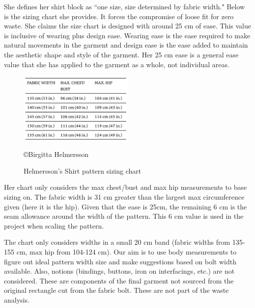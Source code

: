 She defines her shirt block as ``one size, size determined by fabric width." Below is the sizing chart she provides. It forces the compromise of loose fit for zero waste. 
She claims the size chart is designed with around 25 cm of ease. This value is inclusive of wearing plus design ease. Wearing ease is the ease required to make natural movements in the garment and design ease is the ease added to maintain the aesthetic shape and style of the garment. Her 25 cm ease is a general ease value that she has applied to the garment as a whole, not individual areas. 
\begin{figure} [H] %
    \centering %
    \includegraphics[width = 0.5\textwidth]{Images/BH size chart.png} %
    \caption{Helmersson's Shirt pattern sizing chart}
    \copyright {Birgitta Helmersson} %
\end{figure}
Her chart only considers the max chest/bust and max hip measurements to base sizing on. The fabric width is 31 cm greater than the largest max circumference given (here it is the hip). Given that the ease is 25cm, the remaining 6 cm is the seam allowance around the width of the pattern. This 6 cm value is used in the project when scaling the pattern.

The chart only considers widths in a small 20 cm band (fabric widths from 135-155 cm, max hip from 104-124 cm). Our aim is to use body measurements to figure out ideal pattern width size and make suggestions based on bolt width available. Also, notions (bindings, buttons, iron on interfacings, etc.) are not considered. These are components of the final garment not sourced from the original rectangle cut from the fabric bolt. These are not part of the waste analysis.

